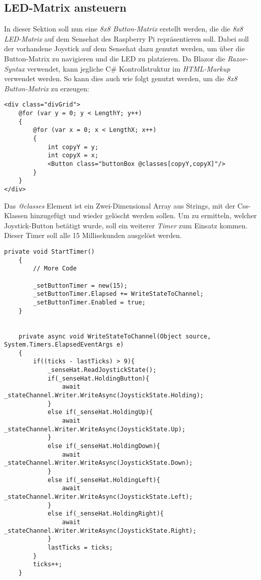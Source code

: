 \subsection{LED-Matrix ansteuern}
\label{subsec:ledMatrix}
In dieser Sektion soll nun eine \emph{8x8 Button-Matrix} erstellt werden, die die \emph{8x8
LED-Matrix} auf dem Sensehat des Raspberry Pi repräsentieren soll. Dabei soll der vorhandene
Joystick auf dem Sensehat dazu genutzt werden, um über die Button-Matrix zu navigieren und die
LED zu platzieren.
\newline
\newline
Da Blazor die \emph{Razor-Syntax} verwendet, kann jegliche C\# Kontrollstruktur im
\emph{HTML-Markup} verwendet werden. So kann dies auch wie folgt genutzt werden, um die \emph{8x8
Button-Matrix} zu erzeugen:

\begin{lstlisting}[language={[Sharp]C}, caption=Button-Matrix,
    label=lst:ButtonMatrix]
<div class="divGrid">
    @for (var y = 0; y < LengthY; y++)
    {
        @for (var x = 0; x < LengthX; x++)
        {
            int copyY = y;
            int copyX = x;
            <Button class="buttonBox @classes[copyY,copyX]"/>
        }
    }
</div>
\end{lstlisting}

Das \emph{@classes} Element ist ein Zwei-Dimensional Array aus Strings, mit der
Css-Klassen hinzugefügt und wieder gelöscht werden sollen. Um zu ermitteln, welcher
Joystick-Button betätigt wurde, soll ein weiterer
\emph{Timer} zum Einsatz kommen. Dieser Timer soll alle 15 Millisekunden ausgelöst werden.

\begin{lstlisting}[language={[Sharp]C}, caption=Timer: ButtonTimer,
    label=lst:ButtonTimer]
    private void StartTimer()
    {
        // More Code

        _setButtonTimer = new(15);
        _setButtonTimer.Elapsed += WriteStateToChannel;
        _setButtonTimer.Enabled = true;
    }


    private async void WriteStateToChannel(Object source, System.Timers.ElapsedEventArgs e)
    {
        if((ticks - lastTicks) > 9){
            _senseHat.ReadJoystickState();
            if(_senseHat.HoldingButton){
                await _stateChannel.Writer.WriteAsync(JoystickState.Holding);
            }
            else if(_senseHat.HoldingUp){
                await _stateChannel.Writer.WriteAsync(JoystickState.Up);
            }
            else if(_senseHat.HoldingDown){
                await _stateChannel.Writer.WriteAsync(JoystickState.Down);
            }
            else if(_senseHat.HoldingLeft){
                await _stateChannel.Writer.WriteAsync(JoystickState.Left);
            }
            else if(_senseHat.HoldingRight){
                await _stateChannel.Writer.WriteAsync(JoystickState.Right);
            }
            lastTicks = ticks;
        }
        ticks++;
    }
\end{lstlisting}

